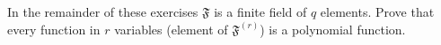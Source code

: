 In the remainder of these exercises $\mathfrak{F}$ is a finite field of $q$ elements. Prove that every function in $r$ variables (element of $\mathfrak{F}^{(r)}$) is a polynomial function.